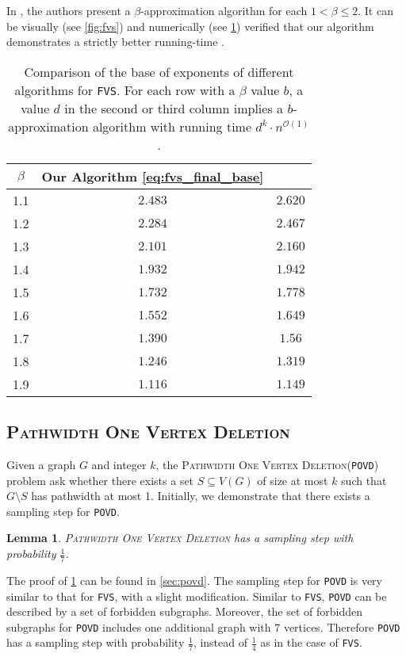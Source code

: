 \documentclass[letterpaper,11pt]{article}
\newcommand{\1}[1]{\mathds{1}\left[#1\right]}
\newcommand{\Oh}{\mathcal{O}}
\newtheorem{lemma}[theorem]{Lemma}
\newcommand{\FVS}{\textnormal{\texttt{FVS}}\xspace}
\newcommand{\POVD}{\textnormal{\texttt{POVD}}\xspace}
\newcommand{\povd}{\textsc{Pathwidth One Vertex Deletion}\xspace}
\begin{document}
In \cite{janaParameterizedApproximationScheme2023}, the authors present a $\beta$-approximation
algorithm for each $1 < \beta \leq 2$. It can be visually (see \cref{fig:fvs}) and numerically (see \cref{tab:fvs}) verified that our algorithm demonstrates a
strictly better running-time .

\begin{table}[h]
    \centering
    \begin{tabular}{|c|c|c|}
        \hline
	$\beta$ & Our Algorithm \eqref{eq:fvs_final_base} & \cite{janaParameterizedApproximationScheme2023} \\
        \hline
        1.1 & $2.483$ & $2.620$ \\
        1.2 & $2.284$ & $2.467$ \\
        1.3 & $2.101$ & $2.160$ \\
        1.4 & $1.932$ & $1.942$ \\
        1.5 & $1.732$ & $1.778$ \\
        1.6 & $1.552$ & $1.649$ \\
        1.7 & $1.390$ & $1.56$ \\
        1.8 & $1.246$ & $1.319$ \\
        1.9 & $1.116$ & $1.149$ \\
        \hline
    \end{tabular}
    \caption{Comparison of the base of exponents of different algorithms for \FVS.
 	   For each row with a $\beta$ value $b$, a value $d$ in the second or third column
	implies a $b$-approximation algorithm with running time $d^{k} \cdot n^{\Oh(1)}$.}    
    \label{tab:fvs}
\end{table}




 
\subsection{\povd}
Given a graph $G$ and integer $k$, the \povd (\POVD) problem ask whether there exists a set $S \subseteq V(G)$
of size at most $k$ such that $G \setminus S$ has pathwidth at most 1.
Initially, we demonstrate that there exists a sampling step for \POVD.

\begin{lemma}\label{lemma:povd_sampling}
	\povd has a sampling step with probability $\frac{1}{7}$.
\end{lemma}

The proof of \cref{lemma:povd_sampling} can be found in \cref{sec:povd}.
The sampling step for \POVD is very similar to that for \FVS, with a slight modification.
Similar to \FVS, \POVD can be described by a set of forbidden subgraphs.
Moreover, the set of forbidden subgraphs for \POVD includes one additional graph with 7 vertices. Therefore \POVD has a sampling step with probability $\frac{1}{7}$,
instead of $\frac{1}{4}$ as in the case of \FVS. 
\end{document}
